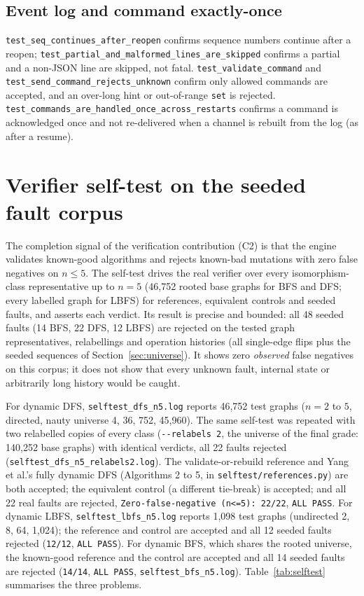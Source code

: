\subsection{Event log and command exactly-once}

\texttt{test\_seq\_continues\_after\_reopen} confirms sequence numbers continue
after a reopen; \texttt{test\_partial\_and\_malformed\_lines\_are\_skipped}
confirms a partial and a non-JSON line are skipped, not fatal.
\texttt{test\_validate\_command} and \texttt{test\_send\_command\_rejects\_unknown}
confirm only allowed commands are accepted, and an over-long hint or
out-of-range \texttt{set} is rejected.
\texttt{test\_commands\_are\_handled\_once\_across\_restarts} confirms a command
is acknowledged once and not re-delivered when a channel is rebuilt from the
log (as after a resume).

\section{Verifier self-test on the seeded fault corpus}
\label{sec:test-selftest}

The completion signal of the verification contribution (C2) is that the engine
validates known-good algorithms and rejects known-bad mutations with zero false
negatives on $n \le 5$. The self-test drives the real verifier over every
isomorphism-class representative up to $n = 5$ (46,752 rooted base graphs for
BFS and DFS; every labelled graph for LBFS) for references, equivalent controls
and seeded faults, and asserts each verdict. Its result is precise and bounded:
all 48 seeded faults (14 BFS, 22 DFS, 12 LBFS) are rejected on the tested graph
representatives, relabellings and operation histories (all single-edge flips
plus the seeded sequences of Section~\ref{sec:universe}). It shows zero
\emph{observed} false negatives on this corpus; it does not show that every
unknown fault, internal state or arbitrarily long history would be caught.

For dynamic DFS, \texttt{selftest\_dfs\_n5.log} reports 46{,}752 test graphs
($n = 2$ to $5$, directed, nauty universe 4, 36, 752, 45{,}960). The same
self-test was repeated with two relabelled copies of every class
(\texttt{-{}-relabels 2}, the universe of the final grade: 140{,}252 base graphs)
with identical verdicts, all 22 faults rejected
(\texttt{selftest\_dfs\_n5\_relabels2.log}). The
validate-or-rebuild reference and Yang et al.'s fully dynamic DFS
\citep{yang2019dynamic} (Algorithms 2 to 5, in \texttt{selftest/references.py})
are both accepted; the equivalent control (a different tie-break) is accepted;
and all 22 real faults are rejected,
\texttt{Zero-false-negative (n<=5): 22/22}, \texttt{ALL PASS}. For dynamic LBFS,
\texttt{selftest\_lbfs\_n5.log} reports 1{,}098 test graphs (undirected 2, 8,
64, 1{,}024); the reference and control are accepted and all 12 seeded faults
rejected (\texttt{12/12}, \texttt{ALL PASS}). For dynamic BFS, which shares the
rooted universe, the known-good reference and the control are accepted and all 14
seeded faults are rejected (\texttt{14/14}, \texttt{ALL PASS},
\texttt{selftest\_bfs\_n5.log}).
Table~\ref{tab:selftest} summarises the three problems.

